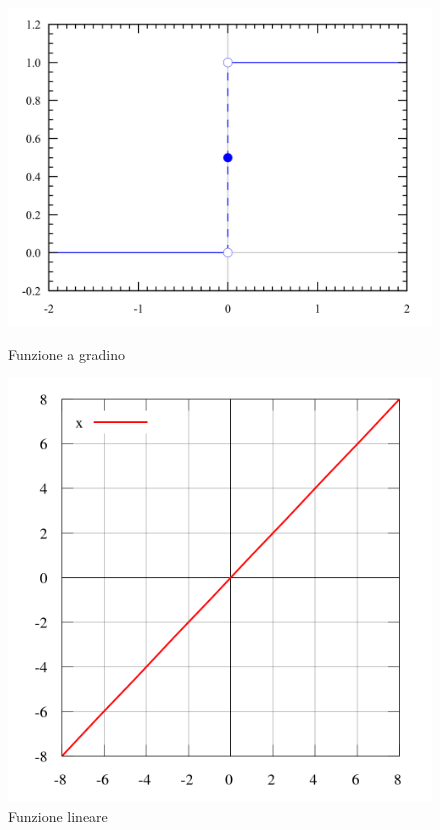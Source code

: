 \documentclass[%
    corpo=12pt,
    twoside,
    oldstyle,
    autoretitolo,
    greek,
    evenboxes,
]{toptesi}
\begin{document}
\begin{figure}
  \centering
  \begin{minipage}{.5\textwidth}
    \centering
    \includegraphics[width=0.85\linewidth]{figure/step.png}
    \caption{Funzione a gradino}
    \label{fig:step}
  \end{minipage}%
  \begin{minipage}{.5\textwidth}
    \centering
    \includegraphics[width=0.75\linewidth]{figure/linear.png}
    \caption{Funzione lineare}
    \label{fig:linear}
  \end{minipage}
\end{figure}
\end{document}
